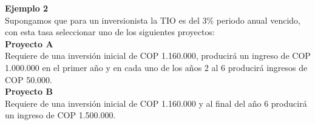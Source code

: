 \textbf{Ejemplo 2}\\

Supongamos que para un inversionista la TIO es del 3\% periodo anual vencido, con esta tasa seleccionar uno de los siguientes proyectos:\\

\textbf{Proyecto A}\\
Requiere de una inversión inicial de  COP  1.160.000, producirá un ingreso de  COP  1.000.000 en el primer año y en cada uno de los años 2 al 6 producirá ingresos de  COP  50.000.\\

\textbf{Proyecto B}\\
Requiere de una inversión inicial de  COP  1.160.000 y al final del año 6 producirá un ingreso de  COP  1.500.000.
\\


